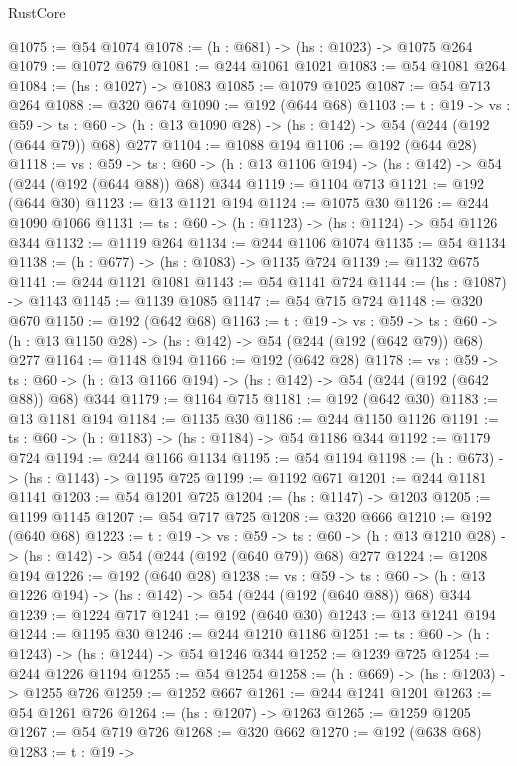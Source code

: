 \begin{lexlean}{RustCore}
\begin{coremodule}
@1075 := @54 @1074
@1078 := (h : @681) -> (hs : @1023) -> @1075 @264
@1079 := @1072 @679
@1081 := @244 @1061 @1021
@1083 := @54 @1081 @264
@1084 := (hs : @1027) -> @1083
@1085 := @1079 @1025
@1087 := @54 @713 @264
@1088 := @320 @674
@1090 := @192 (@644 @68)
@1103 := {t : @19} ->
  {vs : @59} ->
  {ts : @60} -> (h : @13 @1090 @28) -> (hs : @142) -> @54 (@244 (@192 (@644 @79)) @68) @277
@1104 := @1088 @194
@1106 := @192 (@644 @28)
@1118 := {vs : @59} ->
  {ts : @60} -> (h : @13 @1106 @194) -> (hs : @142) -> @54 (@244 (@192 (@644 @88)) @68) @344
@1119 := @1104 @713
@1121 := @192 (@644 @30)
@1123 := @13 @1121 @194
@1124 := @1075 @30
@1126 := @244 @1090 @1066
@1131 := {ts : @60} -> (h : @1123) -> (hs : @1124) -> @54 @1126 @344
@1132 := @1119 @264
@1134 := @244 @1106 @1074
@1135 := @54 @1134
@1138 := (h : @677) -> (hs : @1083) -> @1135 @724
@1139 := @1132 @675
@1141 := @244 @1121 @1081
@1143 := @54 @1141 @724
@1144 := (hs : @1087) -> @1143
@1145 := @1139 @1085
@1147 := @54 @715 @724
@1148 := @320 @670
@1150 := @192 (@642 @68)
@1163 := {t : @19} ->
  {vs : @59} ->
  {ts : @60} -> (h : @13 @1150 @28) -> (hs : @142) -> @54 (@244 (@192 (@642 @79)) @68) @277
@1164 := @1148 @194
@1166 := @192 (@642 @28)
@1178 := {vs : @59} ->
  {ts : @60} -> (h : @13 @1166 @194) -> (hs : @142) -> @54 (@244 (@192 (@642 @88)) @68) @344
@1179 := @1164 @715
@1181 := @192 (@642 @30)
@1183 := @13 @1181 @194
@1184 := @1135 @30
@1186 := @244 @1150 @1126
@1191 := {ts : @60} -> (h : @1183) -> (hs : @1184) -> @54 @1186 @344
@1192 := @1179 @724
@1194 := @244 @1166 @1134
@1195 := @54 @1194
@1198 := (h : @673) -> (hs : @1143) -> @1195 @725
@1199 := @1192 @671
@1201 := @244 @1181 @1141
@1203 := @54 @1201 @725
@1204 := (hs : @1147) -> @1203
@1205 := @1199 @1145
@1207 := @54 @717 @725
@1208 := @320 @666
@1210 := @192 (@640 @68)
@1223 := {t : @19} ->
  {vs : @59} ->
  {ts : @60} -> (h : @13 @1210 @28) -> (hs : @142) -> @54 (@244 (@192 (@640 @79)) @68) @277
@1224 := @1208 @194
@1226 := @192 (@640 @28)
@1238 := {vs : @59} ->
  {ts : @60} -> (h : @13 @1226 @194) -> (hs : @142) -> @54 (@244 (@192 (@640 @88)) @68) @344
@1239 := @1224 @717
@1241 := @192 (@640 @30)
@1243 := @13 @1241 @194
@1244 := @1195 @30
@1246 := @244 @1210 @1186
@1251 := {ts : @60} -> (h : @1243) -> (hs : @1244) -> @54 @1246 @344
@1252 := @1239 @725
@1254 := @244 @1226 @1194
@1255 := @54 @1254
@1258 := (h : @669) -> (hs : @1203) -> @1255 @726
@1259 := @1252 @667
@1261 := @244 @1241 @1201
@1263 := @54 @1261 @726
@1264 := (hs : @1207) -> @1263
@1265 := @1259 @1205
@1267 := @54 @719 @726
@1268 := @320 @662
@1270 := @192 (@638 @68)
@1283 := {t : @19} ->

\end{coremodule}
\end{lexlean}
